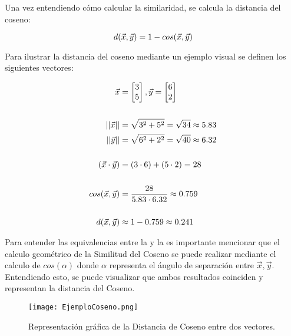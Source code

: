     Una vez entendiendo cómo calcular la similaridad, se calcula la distancia del coseno:
    
    \begin{equation}
        d(\vec{x}, \vec{y}) = 1 - cos(\vec{x}, \vec{y})
        \addequation{Definición de Distancia del Coseno}
    \end{equation}

    Para ilustrar la distancia del coseno mediante un ejemplo visual se definen los siguientes vectores:

    \begin{equation}
        \begin{split}
            \vec{x} &= \begin{bmatrix}
                3
                \\
                5
            \end{bmatrix},  
            \vec{y} = \begin{bmatrix}
                6
                \\
                2
            \end{bmatrix}
            \\
            \\
            || \vec{x} || &= \sqrt{3^2 + 5^2} = \sqrt{34} \approx 5.83
            \\
            || \vec{y} || &= \sqrt{6^2 + 2^2} = \sqrt{40} \approx 6.32
            \\
            \\
            ( \vec{x} \cdot \vec{y} )&=(3 \cdot  6)+(5 \cdot 2)=28
            \\
            \\
            cos(\vec{x}, \vec{y}) & = \frac{28}{5.83 \cdot 6.32} \approx 0.759
            \\
            \\
            d(\vec{x}, \vec{y}) &\approx 1 - 0.759 \approx  0.241
        \end{split}
        \addequation{Ejemplo de Distancia del Coseno}
        \label{eq:EjemploCoseno}
    \end{equation}

    \newpage

    Para entender las equivalencias entre la  y la  es importante mencionar que el calculo geométrico de la Similitud del Coseno se puede realizar mediante el calculo de $cos(\alpha)$ donde $\alpha$ representa el ángulo de separación entre $\vec{x}, \vec{y}$. Entendiendo esto, se puede visualizar que ambos resultados coinciden y representan la distancia del Coseno.

    \begin{figure}[h!]
        \centering
        \texttt{[image: EjemploCoseno.png]}
        \caption{Representación gráfica de la Distancia de Coseno entre dos vectores.}
        \label{fig: EjemploCoseno}
    \end{figure}



    

    \newpage

    





    